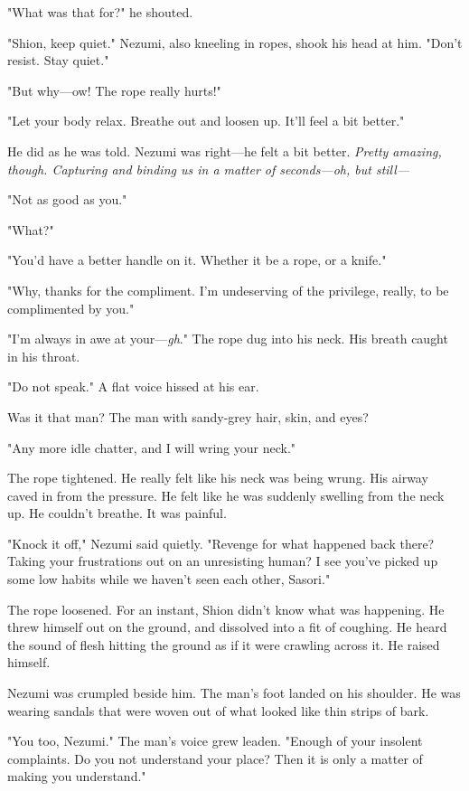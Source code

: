 "What was that for?" he shouted.

"Shion, keep quiet." Nezumi, also kneeling in ropes, shook his head at
him. "Don't resist. Stay quiet."

"But why---ow! The rope really hurts!"

"Let your body relax. Breathe out and loosen up. It'll feel a bit
better."

He did as he was told. Nezumi was right---he felt a bit better. \emph{Pretty
amazing, though. Capturing and binding us in a matter of seconds---oh, but
still---}

"Not as good as you."

"What?"

"You'd have a better handle on it. Whether it be a rope, or a knife."

"Why, thanks for the compliment. I'm undeserving of the privilege,
really, to be complimented by you."

"I'm always in awe at your---\emph{gh}." The rope dug into his neck. His breath
caught in his throat.

"Do not speak." A flat voice hissed at his ear.

Was it that man? The man with sandy-grey hair, skin, and eyes?

"Any more idle chatter, and I will wring your neck."

The rope tightened. He really felt like his neck was being wrung. His
airway caved in from the pressure. He felt like he was suddenly swelling
from the neck up. He couldn't breathe. It was painful.

"Knock it off," Nezumi said quietly. "Revenge for what happened back
there? Taking your frustrations out on an unresisting human? I see
you've picked up some low habits while we haven't seen each other,
Sasori."

The rope loosened. For an instant, Shion didn't know what was happening.
He threw himself out on the ground, and dissolved into a fit of
coughing. He heard the sound of flesh hitting the ground as if it were
crawling across it. He raised himself.

Nezumi was crumpled beside him. The man's foot landed on his shoulder.
He was wearing sandals that were woven out of what looked like thin
strips of bark.

"You too, Nezumi." The man's voice grew leaden. "Enough of your insolent
complaints. Do you not understand your place? Then it is only a matter
of making you understand."

